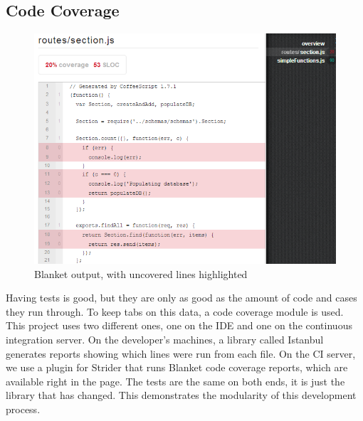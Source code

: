\documentclass[12pt]{article}
\begin{document}
\subsection{Code Coverage}\label{sec:coverage}
\begin{figure}[h!]
\includegraphics[width=\linewidth]{img/strider_3.png}
\caption{Blanket output, with uncovered lines highlighted}
\end{figure}
Having tests is good, but they are only as good as the amount of code and cases they run through. To keep tabs on this data, a code coverage module is used. This project uses two different ones, one on the IDE and one on the continuous integration server. On the developer's machines, a library called Istanbul\cite{Istanbul} generates reports showing which lines were run from each file. On the CI server, we use a plugin\cite{Blanket} for Strider that runs Blanket code coverage reports, which are available right in the page. The tests are the same on both ends, it is just the library that has changed. This demonstrates the modularity of this development process.
\end{document}
